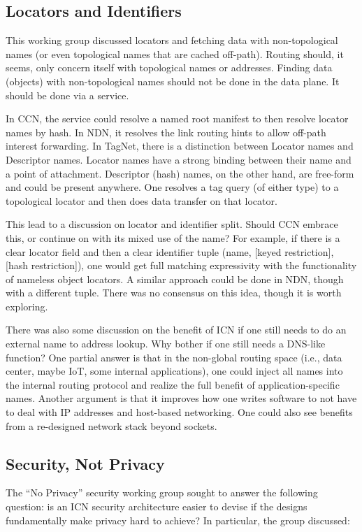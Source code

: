 \documentclass{sig-alternate-10pt}
\begin{document}
\subsection{Locators and Identifiers}
This working group discussed locators and fetching data with non-topological names (or even topological names that are cached off-path). Routing should, it seems, only concern itself with topological names or addresses.  Finding data (objects) with non-topological names should not be done in the data plane.  It should be done via a service.

In CCN, the service could resolve a named root manifest to then resolve locator names by hash.
In NDN, it resolves the link routing hints to allow off-path interest forwarding. In TagNet,
there is a distinction between Locator names and Descriptor names. Locator names have a
strong binding between their name and a point of attachment. Descriptor (hash) names, on the
other hand, are free-form and could be present anywhere.  One resolves a tag query (of either
type) to a topological locator and then does data transfer on that locator.

This lead to a discussion on locator and identifier split.  Should CCN embrace this, or continue on with its mixed use of the name? For example, if there is a clear locator field and then a clear identifier tuple (name, [keyed restriction], [hash restriction]), one would get full matching expressivity with the functionality of nameless object locators.  A similar approach could be done in NDN, though with a different tuple.  There was no consensus on this idea, though it is worth exploring.

There was also some discussion on the benefit of ICN if one still needs to do an external name to address lookup.  Why bother if one still needs a DNS-like function?  One partial answer is that in the non-global routing space (i.e., data center, maybe IoT, some internal applications), one could inject all names into the internal routing protocol and realize the full benefit of application-specific names.  Another argument is that it improves how one writes software to not have to deal with IP addresses and host-based networking. One could also see benefits from a re-designed network stack beyond sockets.

\subsection{Security, Not Privacy}
The ``No Privacy'' security working group sought to answer the following question: is an ICN security architecture easier to devise if the designs fundamentally make privacy hard to achieve? In particular, the group discussed:
\end{document}
